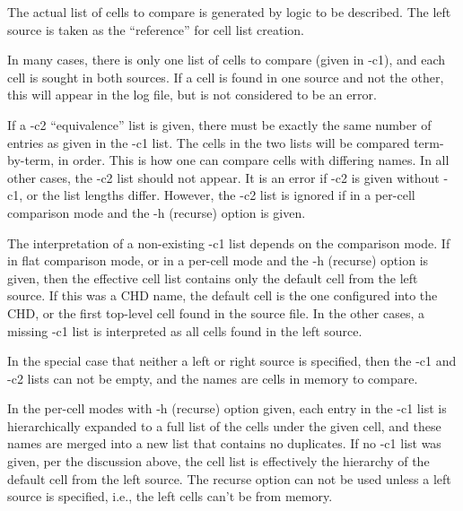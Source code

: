 The actual list of cells to compare is generated by logic to be
described.  The left source is taken as the ``reference'' for cell
list creation.

In many cases, there is only one list of cells to compare (given in
{\vt -c1}), and each cell is sought in both sources.  If a cell is
found in one source and not the other, this will appear in the log
file, but is not considered to be an error.

If a {\vt -c2} ``equivalence'' list is given, there must be exactly
the same number of entries as given in the {\vt -c1} list.  The cells
in the two lists will be compared term-by-term, in order.  This is how
one can compare cells with differing names.  In all other cases, the
{\vt -c2} list should not appear.  It is an error if {\vt -c2} is
given without {\vt -c1}, or the list lengths differ.  However, the
{\vt -c2} list is ignored if in a per-cell comparison mode and the
{\vt -h} (recurse) option is given.

The interpretation of a non-existing {\vt -c1} list depends on the
comparison mode.  If in flat comparison mode, or in a per-cell mode
and the {\vt -h} (recurse) option is given, then the effective cell
list contains only the default cell from the left source.  If this was
a CHD name, the default cell is the one configured into the CHD, or
the first top-level cell found in the source file.  In the other
cases, a missing {\vt -c1} list is interpreted as all cells found in
the left source.

In the special case that neither a left or right source is specified,
then the {\vt -c1} and {\vt -c2} lists can not be empty, and the names
are cells in memory to compare.

In the per-cell modes with {\vt -h} (recurse) option given, each entry
in the {\vt -c1} list is hierarchically expanded to a full list of the
cells under the given cell, and these names are merged into a new list
that contains no duplicates.  If no {\vt -c1} list was given, per the
discussion above, the cell list is effectively the hierarchy of the
default cell from the left source.  The recurse option can not be used
unless a left source is specified, i.e., the left cells can't be from
memory.

